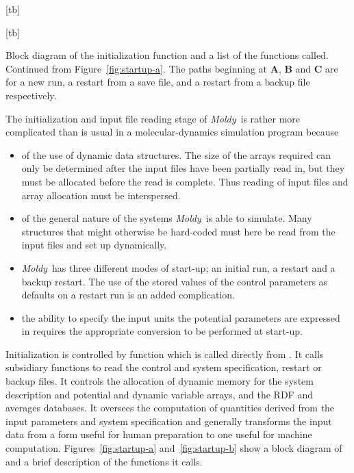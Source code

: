\documentclass[a4paper,twoside]{report}
\makeatletter
\newcounter{subfig}
\newenvironment{superfig}{%
\setcounter{subfig}{0}
\addtocounter{figure}{1}
}{\setcounter{subfig}{0}}
\newenvironment{partfigure}[1][tbp]{%
\addtocounter{subfig}{1}\addtocounter{figure}{-1}%
\@float{figure}[#1]%
\renewcommand{\thefigure}{\thechapter.\arabic{figure}(\alph{subfig})}%
}{\end@float}
\newcommand{\moldy}{\emph{Moldy}}
\makeatother
\begin{document}
\begin{superfig}
\begin{partfigure}[tb]
\end{partfigure}

\begin{partfigure}[tb]
\begin{center}

\end{center}
\caption[Block diagram of initialization function
]{Block diagram of the initialization function
   and a list of the functions called.  Continued
  from Figure~\ref{fig:startup-a}.  The paths beginning at \textbf{A},
  \textbf{B} and \textbf{C} are for a new run, a restart from a save
  file, and a restart from a backup file respectively.}
\label{fig:startup-b}
\end{partfigure}
\end{superfig}

The initialization and input file reading stage of \moldy\ is rather
more complicated than is usual in a molecular-dynamics simulation
program because
\begin{itemize}
\item of the use of dynamic data structures.  The size of the arrays
  required can only be determined after the input files have been
  partially read in, but they must be allocated before the read is
  complete. Thus reading of input files and array allocation must be
  interspersed.
\item of the general nature of the systems \moldy\ is able to simulate.
  Many structures that might otherwise be hard-coded must here be read
  from the input files and set up dynamically.
\item \moldy\ has three different modes of start-up; an initial run,
  a restart and a backup restart.  The use of the stored values of the
  control parameters as defaults on a restart run is an added
  complication. 
\item the ability to specify the input units the potential parameters
  are expressed in requires the appropriate conversion to be performed
  at start-up.
\end{itemize}

Initialization is controlled by function  which is
called directly from . It calls subsidiary functions to
read the control and system specification, restart or backup files.
It controls the allocation of dynamic memory for the system
description and potential and dynamic variable arrays, and the RDF and
averages databases. It oversees the computation of quantities derived
from the input parameters and system specification and generally
transforms the input data from a form useful for human preparation to
one useful for machine computation. Figures~\ref{fig:startup-a}
and~\ref{fig:startup-b} show a block diagram of  and
a brief description of the functions it calls.
\end{document}
